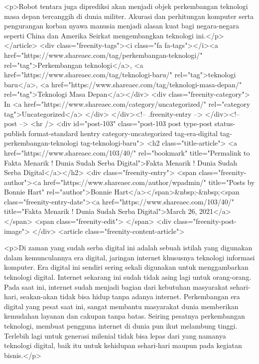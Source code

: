 <p>Robot tentara juga diprediksi akan menjadi objek perkembangan teknologi masa depan tercanggih di dunia militer. Akurasi dan perhitungan komputer serta pengurangan korban nyawa manusia menjadi alasan kuat bagi negara-negara seperti China dan Amerika Seirkat mengembangkan teknologi ini.</p>
									</article>
																			<div class="freenity-tags"><i class="fa fa-tags"></i><a href="https://www.shareaec.com/tag/perkembangan-teknologi/" rel="tag">Perkembangan teknologi</a>, <a href="https://www.shareaec.com/tag/teknologi-baru/" rel="tag">teknologi baru</a>, <a href="https://www.shareaec.com/tag/teknologi-masa-depan/" rel="tag">Teknologi Masa Depan</a></div>
																			<div class="freenity-category">
											In <a href="https://www.shareaec.com/category/uncategorized/" rel="category tag">Uncategorized</a>										</div>
																	</div><!-- .freenity-entry -->
							</div><!-- post -->
							<hr />
													<div id="post-103" class="post-103 post type-post status-publish format-standard hentry category-uncategorized tag-era-digital tag-perkembangan-teknologi tag-teknologi-baru">
								<h2 class="title-article">
									<a href="https://www.shareaec.com/103/40/" rel="bookmark" title="Permalink to Fakta Menarik ! Dunia Sudah Serba Digital">Fakta Menarik ! Dunia Sudah Serba Digital</a></h2>
								<div class="freenity-entry">
									<span class="freenity-author"><a href="https://www.shareaec.com/author/wpadmin/" title="Posts by Bonnie Hart" rel="author">Bonnie Hart</a></span>&nbsp;-&nbsp;<span class="freenity-entry-date"><a href="https://www.shareaec.com/103/40/" title="Fakta Menarik ! Dunia Sudah Serba Digital">March 26, 2021</a></span>
									<span class="freenity-edit"> </span>
									<div class="freenity-post-image">  </div>
																		<article class="freenity-content-article">
										
<p>Di zaman yang sudah serba digital ini adalah sebuah istilah yang digunakan dalam kemunculannya era digital, jaringan internet khususnya teknologi informasi komputer. Era digital ini sendiri sering sekali digunakan untuk menggambarkan teknologi digital. Internet sekarang ini sudah tidak asing lagi untuk orang-orang. Pada saat ini, internet sudah menjadi bagian dari kebutuhan masyarakat sehari-hari, seakan-akan tidak bisa hidup tanpa adanya internet. Perkembangan era digital yang pesat saat ini, sangat membantu masyarakat dunia memberikan kemudahan layanan dan cakupan tanpa batas. Seiring pesatnya perkembangan teknologi, membuat pengguna internet di dunia pun ikut melambung tinggi. Terlebih lagi untuk generasi milenial tidak bisa lepas dari yang namanya teknologi digital, baik itu untuk kehidupan sehari-hari maupun pada kegiatan bisnis.</p>



